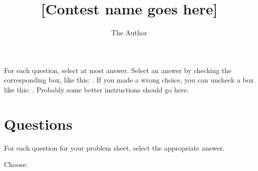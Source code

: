\documentclass[
  english,
  ]{sdapsclassic}
\author{The Author}
\title{[Contest name goes here]}
\begin{document}

  \begin{questionnaire}[noinfo]
  \begin{Form}
    \begin{info}
      For each question, select at most answer. Select an answer by checking
      the corresponding box, like this: \checkedbox*{}. If you made a wrong
      choice, you can uncheck a box like this: \correctedbox*{}.
      Probably some better instructions should go here.
    \end{info}


    \section{Questions}

    \begin{info}
      For each question for your problem sheet, select the appropriate answer.
    \end{info}

    \begin{center}
    \begin{choicegroup}[singlechoice,align=center]{Choose:}

    \end{choicegroup}
  \end{center}

  \end{Form}
  \end{questionnaire}
\end{document}
